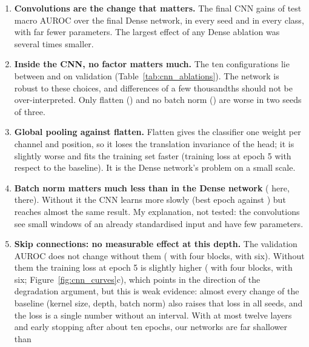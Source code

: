 \begin{enumerate}[leftmargin=1.4em,itemsep=2pt]
  \item \textbf{Convolutions are the change that matters.} The final CNN gains \cnnDiffDenseMean{}
        of test macro AUROC over the final Dense network, in every seed and in every class, with far
        fewer parameters. The largest effect of any Dense ablation was several times smaller.
  \item \textbf{Inside the CNN, no factor matters much.} The ten configurations lie between
        \cnnValAurocMeanFlatten{} and \cnnValAurocMeanNoDropout{} on validation
        (Table~\ref{tab:cnn_ablations}). The network is robust to these choices, and differences of
        a few thousandths should not be over-interpreted. Only flatten (\cnnDiffMeanFlatten{}) and no
        batch norm (\cnnDiffMeanNoBn{}) are worse in two seeds of three.
  \item \textbf{Global pooling against flatten.} Flatten gives the classifier one weight per channel
        and position, so it loses the translation invariance of the head; it is slightly worse and fits
        the training set faster (training loss at epoch 5 \cnnTrainLossEpFiveDiffMeanFlatten{} with
        respect to the baseline). It is the Dense network's problem on a small scale.
  \item \textbf{Batch norm matters much less than in the Dense network} (\cnnDiffMeanNoBn{} here,
        \denseDiffMeanNoBn{} there). Without it the CNN learns more slowly (best epoch
        \intval{\cnnBestEpochMeanNoBn} against \intval{\cnnBestEpochMeanBase}) but reaches almost the
        same result. My explanation, not tested: the convolutions see small windows of an already
        standardised input and have few parameters.
  \item \textbf{Skip connections: no measurable effect at this depth.} The validation AUROC does not
        change without them (\cnnDiffMeanNoResidual{} with four blocks, \cnnDiffMeanDepthSixNoResidual{}
        with six). Without them the training loss at epoch 5 is slightly higher
        (\cnnTrainLossEpFiveDiffMeanNoResidual{} with four blocks, \cnnTrainLossEpFiveDiffMeanDepthSixNoResidual{}
        with six; Figure~\ref{fig:cnn_curves}c), which points in the direction of the degradation argument,
        but this is weak evidence: almost every change of the baseline (kernel size, depth, batch norm)
        also raises that loss in all seeds, and the loss is a single number without an interval. With at
        most twelve layers and early stopping after about ten epochs, our networks are far shallower than

\end{enumerate}
